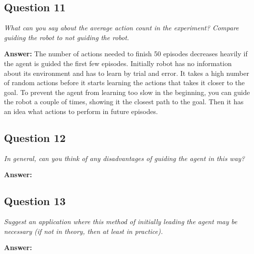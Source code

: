 \documentclass[a4paper]{article}
\begin{document}
\subsection*{Question 11}
\emph{What can you say about the average action count in the experiment? Compare guiding the robot to not guiding the robot.}

\textbf{Answer:} 
The number of actions needed to finish 50 episodes decreases heavily if the agent is guided the first few episodes. Initially robot has no information about its environment and has to learn by trial and error. It takes a high number of random actions before it starts learning the actions that takes it closer to the goal. To prevent the agent from learning too slow in the beginning, you can guide the robot a couple of times, showing it the closest path to the goal. Then it has an idea what actions to perform in future episodes. 

\subsection*{Question 12}
\emph{In general, can you think of any disadvantages of guiding the
agent in this way?} 

\textbf{Answer:} 
 

\subsection*{Question 13}
\emph{Suggest an application where this method of initially leading the
agent may be necessary (if not in theory, then at least in practice).}

\textbf{Answer:} 
\end{document}
